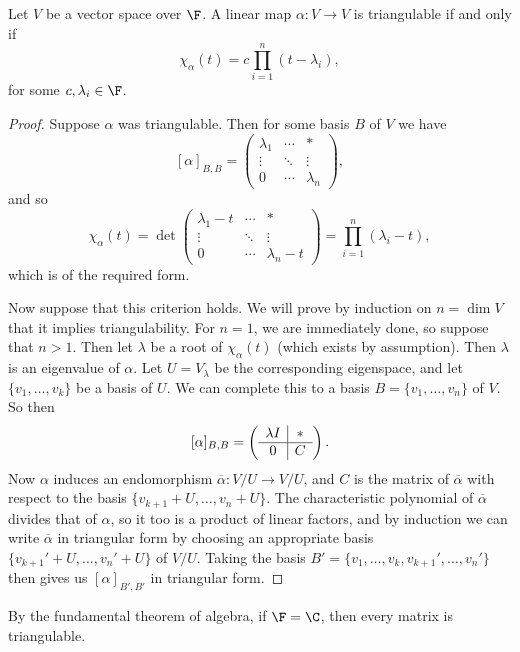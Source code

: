 \begin{theorem}
    Let $V$ be a vector space over $\F$.
    A linear map $\alpha: V \rightarrow V$ is triangulable if and only if
    $$
    \chi_{\alpha}(t) = c \prod_{i = 1}^n (t - \lambda_i),
    $$
    for some $c, \lambda_i\in \F$.
\end{theorem}
\begin{proof}
    Suppose $\alpha$ was triangulable. Then for some basis $B$ of $V$ we have
    $$
    [\alpha]_{B, B} = \begin{pmatrix}
        \lambda_1 & \cdots & * \\
        \vdots & \ddots & \vdots \\
        0 & \cdots & \lambda_n
    \end{pmatrix}, 
    $$
    and so
    $$
    \chi_{\alpha}(t) = \det  \begin{pmatrix}
        \lambda_1 - t & \cdots & * \\
        \vdots & \ddots & \vdots \\
        0 & \cdots & \lambda_n - t
    \end{pmatrix} = \prod_{i = 1}^n(\lambda_i - t),
    $$
    which is of the required form.

    Now suppose that this criterion holds. We will prove by induction on $n = \dim V$ that it implies triangulability. For $n = 1$, we are immediately done, so suppose that $n > 1$. Then let $\lambda$ be a root of $\chi_{\alpha}(t)$ (which exists by assumption). Then $\lambda$ is an eigenvalue of $\alpha$. Let $U = V_\lambda$ be the corresponding eigenspace, and let $\{v_1, \dots, v_k\}$ be a basis of $U$. We can complete this to a basis $B = \{v_1, \dots, v_n\}$ of $V$. So then
    $$
    [\alpha]_{B, B} = \left(\begin{array}{ c | c }
                \lambda I & *\\
                \hline
                0 & C
              \end{array}\right).
    $$
    Now $\alpha$ induces an endomorphism $\overline{\alpha} : V / U \rightarrow V / U$, and $C$ is the matrix of $\overline{\alpha}$ with respect to the basis $\{v_{k + 1} + U, \dots, v_n + U\}$. The characteristic polynomial of $\overline{\alpha}$ divides that of $\alpha$, so it too is a product of linear factors, and by induction we can write $\overline{\alpha}$ in triangular form by choosing an appropriate basis $\{v_{k + 1}' + U, \dots, v_n' + U\}$ of $V/U$. Taking the basis $B' = \{v_1, \dots, v_k, v_{k + 1}', \dots, v_n'\}$ then gives us $[\alpha]_{B', B'}$ in triangular form.
\end{proof}
\begin{remark}
    By the fundamental theorem of algebra, if $\F = \C$, then every matrix is triangulable.
\end{remark}

